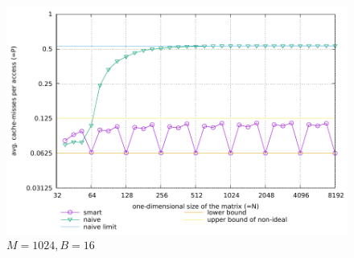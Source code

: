 \documentclass[a4paper,12pt]{article} %
\begin{document}
\begin{figure}
	\caption{$M = 1024, B = 16$}
	\label{m1024b16}
	\includegraphics{sim-m1024-b16.pdf}
\end{figure}
\end{document}
